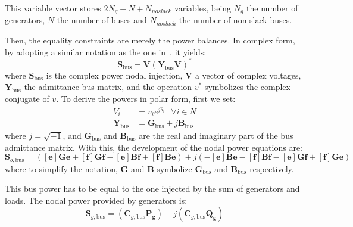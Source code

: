 \documentclass{article}
\begin{document}
This variable vector stores $2N_{g} + N + N_{no slack}$ variables, being $N_{g}$ the number of generators, $N$ the number of buses and $N_{no slack}$ the number of non slack buses. 

Then, the equality constraints are merely the power balances. In complex form, by adopting a similar notation as the one in~\cite{zimmerman2016matpower}, it yields: 
\begin{equation}
    \bm{S}_\text{bus} = \bm{V}(\bm{Y}_\text{bus}\bm{V})^*
    \label{eq:sbus}
\end{equation}
where $\bm{S}_\text{bus}$ is the complex power nodal injection, $\bm{V}$ a vector of complex voltages, $\bm{Y}_\text{bus}$ the admittance bus matrix, and the operation $v^*$ symbolizes the complex conjugate of $v$. To derive the powers in polar form, first we set:
\begin{align}
    V_{i} &= v_{i}e^{j\theta_{i}} \text{   }\forall i\in N \\
    \bm{Y}_\text{bus} &= \bm{G}_\text{bus} + j\bm{B}_\text{bus}
\end{align}
where $j=\sqrt{-1}$, and $\bm{G}_\text{bus}$ and $\bm{B}_\text{bus}$ are the real and imaginary part of the bus admittance matrix. With this, the development of the nodal power equations are:
\begin{equation}
    \bm{S}_{b,\text{bus}} = ([\bm{e}]\bm{G}\bm{e} + [\bm{f}]\bm{G}\bm{f} - [\bm{e}]\bm{B}\bm{f} + [\bm{f}]\bm{B}\bm{e}) + j(-[\bm{e}]\bm{B}\bm{e} - [\bm{f}]\bm{B}\bm{f} - [\bm{e}]\bm{G}\bm{f} + [\bm{f}]\bm{G}\bm{e})
\end{equation}
where to simplify the notation, $\bm{G}$ and $\bm{B}$ symbolize $\bm{G}_\text{bus}$ and $\bm{B}_\text{bus}$ respectively.

This bus power has to be equal to the one injected by the sum of generators and loads. The nodal power provided by generators is:
\begin{equation}
    \bm{S}_{g,\text{bus}} = (\bm{C}_{g,\text{bus}} \bm{P_g}) + j(\bm{C}_{g,\text{bus}} \bm{Q_g})
\end{equation}
\end{document}

